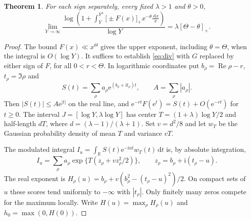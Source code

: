 \documentclass[11pt,a4paper]{article}
\newtheorem{theorem}{Theorem}
\newcommand{\ii}{\mathrm i}
\newcommand{\dd}{\,\mathrm d}
\newcommand{\ee}{\mathrm e}
\newcommand{\Rea}{\operatorname{Re}}
\newcommand{\pos}[1]{\bigl[#1\bigr]_+}
\begin{document}
\begin{theorem}\label{thm:growth}
For each sign separately, every fixed $\lambda>1$ and $\theta>0$,
\begin{equation}\label{eq:growth}
 \lim_{Y\to\infty}\frac{\log\!\left(1+
    \displaystyle\int_Y^{Y^\lambda}\pos{\pm F(x)}x^{-\theta}\frac{\dd x}{x}\right)}
    {\log Y}
      =\lambda[\Theta-\theta]_+ .
\end{equation}
\end{theorem}
\begin{proof}
The bound $F(x)\ll x^\Theta$ gives the upper exponent, including $\theta=\Theta$, when the integral is $O(\log Y)$. It suffices to establish \eqref{eq:div} with $G$ replaced by either sign of $F$, for all $0<r<\Theta$. In logarithmic coordinates put $b_\rho=\Rea\rho-r$, $t_\rho=\Im\rho$ and
\[
 S(t)=\sum_\rho a_\rho\ee^{(b_\rho+\ii t_\rho)t},\qquad A=\sum_\rho|a_\rho|.
\]
Then $|S(t)|\le A\ee^{|t|}$ on the real line, and $\ee^{-rt}F(\ee^t)=S(t)+O(\ee^{-rt})$ for $t\ge0$. The interval $J=[\log Y,\lambda\log Y]$ has center $T=(1+\lambda)\log Y/2$ and half-length $dT$, where $d=(\lambda-1)/(\lambda+1)$. Set $v=d^2/8$ and let $w_T$ be the Gaussian probability density of mean $T$ and variance $vT$.

The modulated integral $I_u=\int_{\mathbb R} S(t)\ee^{-\ii ut}w_T(t)\dd t$ is, by absolute integration,
\begin{equation}\label{eq:score}
 I_u=\sum_\rho a_\rho\exp\{T(z_\rho+vz_\rho^2/2)\},\qquad
 z_\rho=b_\rho+\ii(t_\rho-u).
\end{equation}
The real exponent is $H_\rho(u)=b_\rho+v(b_\rho^2-(t_\rho-u)^2)/2$. On compact sets of $u$ these scores tend uniformly to $-\infty$ with $|t_\rho|$. Only finitely many zeros compete for the maximum locally. Write $H(u)=\max_\rho H_\rho(u)$ and $h_0=\max(0,H(0))$.


\end{proof}
\end{document}
